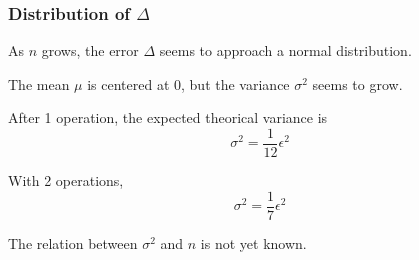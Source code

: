 \documentclass[serif, 12pt]{beamer}
\begin{document}

\begin{frame}

\frametitle{Distribution of $\Delta$}

As $n$ grows, the error $\Delta$ seems to approach a normal distribution.

\vspace{1em}
The mean $\mu$ is centered at 0, but the variance $\sigma^2$ seems to grow.

\vspace{1em}
After 1 operation, the expected theorical variance is
$$ \sigma^2 = \frac{1}{12} \epsilon^2 $$

\vspace{1em}
With 2 operations,
$$ \sigma^2 = \frac{1}{7} \epsilon^2 $$

\vspace{1em}
The relation between $\sigma^2$ and $n$ is not yet known.

\end{frame}
\end{document}
